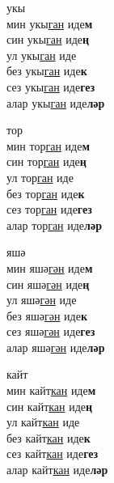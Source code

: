 \begin{multicols}{4}
\begin{enumerate}
\begin{minipage}{\linewidth}
    \item
    укы\\
    мин укы\underline{ган} иде\textbf{м}\\
    син укы\underline{ган} иде\textbf{ң}\\
    ул укы\underline{ган} иде\\
    без укы\underline{ган} иде\textbf{к}\\
    сез укы\underline{ган} иде\textbf{гез}\\
    алар укы\underline{ган} иде\textbf{ләр}\\
\end{minipage}

\begin{minipage}{\linewidth}
    \item
    тор\\
    мин тор\underline{ган} иде\textbf{м}\\
    син тор\underline{ган} иде\textbf{ң}\\
    ул тор\underline{ган} иде\\
    без тор\underline{ган} иде\textbf{к}\\
    сез тор\underline{ган} иде\textbf{гез}\\
    алар тор\underline{ган} иде\textbf{ләр}\\
\end{minipage}

\begin{minipage}{\linewidth}
    \item
    яшә\\
    мин яшә\underline{гән} иде\textbf{м}\\
    син яшә\underline{гән} иде\textbf{ң}\\
    ул яшә\underline{гән} иде\\
    без яшә\underline{гән} иде\textbf{к}\\
    сез яшә\underline{гән} иде\textbf{гез}\\
    алар яшә\underline{гән} иде\textbf{ләр}\\
\end{minipage}

\begin{minipage}{\linewidth}
    \item
    кайт\\
    мин кайт\underline{кан} иде\textbf{м}\\
    син кайт\underline{кан} иде\textbf{ң}\\
    ул кайт\underline{кан} иде\\
    без кайт\underline{кан} иде\textbf{к}\\
    сез кайт\underline{кан} иде\textbf{гез}\\
    алар кайт\underline{кан} иде\textbf{ләр}\\
\end{minipage}


\end{enumerate}
\end{multicols}
